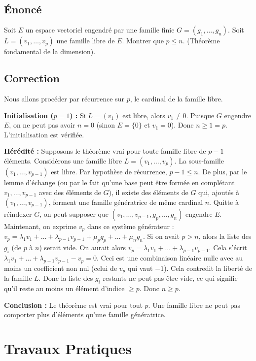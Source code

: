 \documentclass{report}
\begin{document}
\section*{Énoncé}
Soit $E$ un espace vectoriel engendré par une famille finie $G = (g_1, \dots, g_n)$. Soit $L = (v_1, \dots, v_p)$ une famille libre de $E$.
Montrer que $p \le n$. (Théorème fondamental de la dimension).

\section*{Correction}
Nous allons procéder par récurrence sur $p$, le cardinal de la famille libre.

\textbf{Initialisation ($p=1$) :}
Si $L = (v_1)$ est libre, alors $v_1 \neq 0$. Puisque $G$ engendre $E$, on ne peut pas avoir $n=0$ (sinon $E=\{0\}$ et $v_1=0$). Donc $n \ge 1 = p$. L'initialisation est vérifiée.

\textbf{Hérédité :}
Supposons le théorème vrai pour toute famille libre de $p-1$ éléments.
Considérons une famille libre $L = (v_1, \dots, v_p)$.
La sous-famille $(v_1, \dots, v_{p-1})$ est libre. Par hypothèse de récurrence, $p-1 \le n$.
De plus, par le lemme d'échange (ou par le fait qu'une base peut être formée en complétant $v_1, \dots, v_{p-1}$ avec des éléments de $G$), il existe des éléments de $G$ qui, ajoutés à $(v_1, \dots, v_{p-1})$, forment une famille génératrice de même cardinal $n$.
Quitte à réindexer $G$, on peut supposer que $(v_1, \dots, v_{p-1}, g_p, \dots, g_n)$ engendre $E$.
Maintenant, on exprime $v_p$ dans ce système générateur :
$v_p = \lambda_1 v_1 + \dots + \lambda_{p-1} v_{p-1} + \mu_p g_p + \dots + \mu_n g_n$.
Si on avait $p > n$, alors la liste des $g_i$ (de $p$ à $n$) serait vide.
On aurait alors $v_p = \lambda_1 v_1 + \dots + \lambda_{p-1} v_{p-1}$.
Cela s'écrit $\lambda_1 v_1 + \dots + \lambda_{p-1} v_{p-1} - v_p = 0$.
Ceci est une combinaison linéaire nulle avec au moins un coefficient non nul (celui de $v_p$ qui vaut $-1$). Cela contredit la liberté de la famille $L$.
Donc la liste des $g_i$ restants ne peut pas être vide, ce qui signifie qu'il reste au moins un élément d'indice $\ge p$. Donc $n \ge p$.

\textbf{Conclusion :}
Le théorème est vrai pour tout $p$. Une famille libre ne peut pas comporter plus d'éléments qu'une famille génératrice.

\newpage
\chapter*{Travaux Pratiques}
\end{document}
